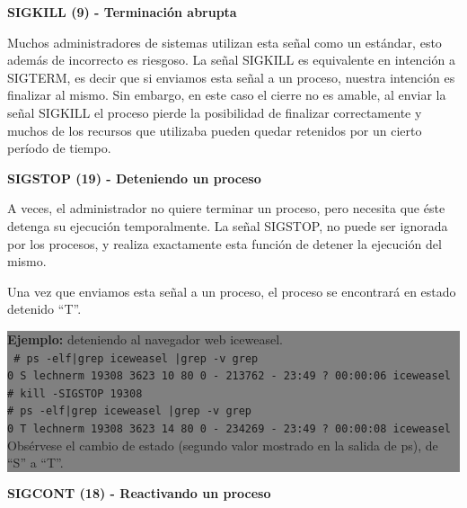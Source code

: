 \documentclass[12pt]{article}
\begin{document}
\textbf{SIGKILL (9) - Terminación abrupta}

Muchos administradores de sistemas utilizan esta señal como un estándar, 
esto además de incorrecto es riesgoso. La señal SIGKILL es equivalente en 
intención a SIGTERM, es decir que si enviamos esta señal a un proceso, 
nuestra intención es finalizar al mismo. Sin embargo, en este caso el
cierre no es amable, al enviar la señal SIGKILL el proceso pierde la 
posibilidad de finalizar correctamente y muchos de los recursos que 
utilizaba pueden quedar retenidos por un cierto período de tiempo.  




\textbf{SIGSTOP (19) - Deteniendo un proceso}

A veces, el administrador no quiere terminar un proceso, pero necesita
que éste detenga su ejecución temporalmente. La señal SIGSTOP, no puede
ser ignorada por los procesos, y realiza exactamente esta función de 
detener la ejecución del mismo. 

Una vez que enviamos esta señal a un proceso, el proceso se encontrará en 
estado detenido ``T''.


\colorbox{grey}{\parbox[t]{0.95\linewidth}{ \vspace*{0.5cm} { 
{\bf Ejemplo:} deteniendo al navegador web iceweasel. \\
{\tt
\# ps -elf|grep iceweasel |grep -v grep \\
0 S lechnerm 19308  3623 10  80   0 - 213762 -     23:49 ?    00:00:06 iceweasel \\

\# kill -SIGSTOP 19308 \\

\# ps -elf|grep iceweasel |grep -v grep \\
0 T lechnerm 19308  3623 14  80   0 - 234269 -     23:49 ?    00:00:08 iceweasel \\
}
Obsérvese el cambio de estado (segundo valor mostrado en la salida de ps), 
de ``S'' a ``T''. 
} \vspace*{0.5cm} } } 


\textbf{SIGCONT (18) - Reactivando un proceso}
\end{document}
